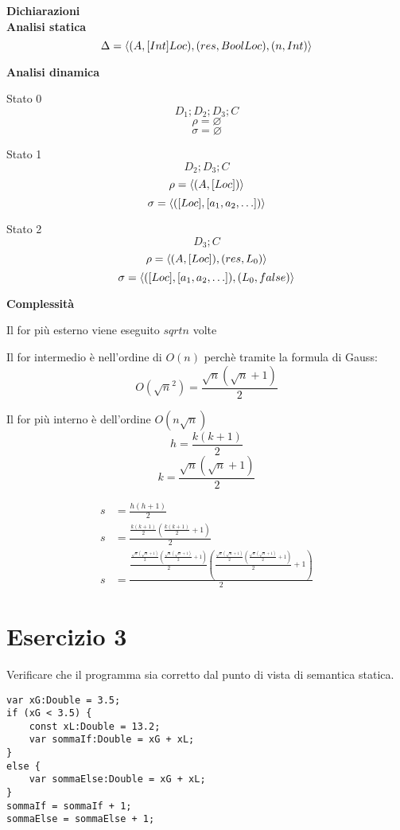 \documentclass{article}
\begin{document}
\textbf{Dichiarazioni} \\
\textbf{Analisi statica}
\[\Delta = \langle (A, [Int]Loc), (res, BoolLoc), (n, Int) \rangle\]

\textbf{Analisi dinamica}

Stato 0
\[D_1;D_2;D_3;C\]
\[\rho = \varnothing\]
\[\sigma = \varnothing\]

Stato 1
\[D_2;D_3;C\]
\[\rho = \langle (A, [Loc]) \rangle\]
\[\sigma = \langle ([Loc], [a_1,a_2,\ldots]) \rangle\]

Stato 2
\[D_3;C\]
\[\rho = \langle (A, [Loc]), (res, L_0) \rangle\]
\[\sigma = \langle ([Loc], [a_1,a_2,\ldots]), (L_0, false) \rangle\]


\textbf{Complessità}

Il for più esterno viene eseguito \(sqrt{n}\) volte

Il for intermedio è nell'ordine di \(O(n)\) perchè tramite la formula di Gauss:
\[O\left(\sqrt{n}^2\right) = \frac{\sqrt{n}(\sqrt{n} + 1)}{2}\]

Il for più interno è dell'ordine \(O(n\sqrt{n})\)
\[h = \frac{k\left(k + 1\right)}{2}\]
\[k = \frac{\sqrt{n}\left(\sqrt{n} + 1\right)}{2}\]

\begin{align*}
    s & = \frac{h(h + 1)}{2}                                                         \\
    s & = \frac{\frac{k\left(k + 1\right)}{2}(\frac{k\left(k + 1\right)}{2} + 1)}{2} \\
    s & = \frac{
        \frac{
            \frac{\sqrt{n}\left(\sqrt{n} + 1\right)}{2}
            \left(
            \frac{\sqrt{n}\left(\sqrt{n} + 1\right)}{2} + 1
            \right)
        }
        {2}
        \left(
        \frac{
            \frac{\sqrt{n}\left(\sqrt{n} + 1\right)}{2}
            \left(
            \frac{\sqrt{n}\left(\sqrt{n} + 1\right)}{2} + 1
            \right)
        }{2} + 1
        \right)
    }
    {2}
\end{align*}

\section{Esercizio 3}
Verificare che il programma sia corretto dal punto di vista di semantica statica.

\begin{verbatim}
var xG:Double = 3.5;
if (xG < 3.5) {
    const xL:Double = 13.2;
    var sommaIf:Double = xG + xL;
}
else {
    var sommaElse:Double = xG + xL;
}
sommaIf = sommaIf + 1;
sommaElse = sommaElse + 1;
\end{verbatim}
\end{document}
